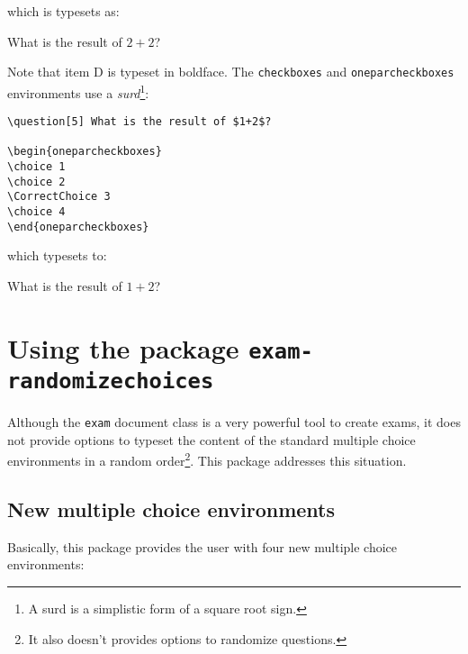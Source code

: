 \documentclass[12pt,a4paper]{exam}
\begin{document}
which is typesets as:

\printanswers

\begin{questions}
\setcounter{question}{4}
\question[5] What is the result of $2+2$?

\begin{choices}
\end{choices}
\end{questions}

Note that item D is typeset in boldface. The \texttt{checkboxes} and \texttt{oneparcheckboxes}
environments use a \emph{surd}\footnote{A surd is a simplistic form of a square root sign.}:

\begin{lstlisting}
\question[5] What is the result of $1+2$?

\begin{oneparcheckboxes}
\choice 1
\choice 2
\CorrectChoice 3
\choice 4
\end{oneparcheckboxes}
\end{lstlisting}

which typesets to:

\begin{questions}
\setcounter{question}{5}
\question[5] What is the result of $1+2$?

\begin{oneparcheckboxes}
\end{oneparcheckboxes}
\end{questions}

\noprintanswers


\section{Using the package \texttt{exam-randomizechoices}}
Although the \texttt{exam} document class is a very powerful tool to
create exams, it does not provide options to typeset the content of the
standard multiple choice environments in a random order\footnote{It
also doesn't provides options to randomize questions.}. This package
addresses this situation.

\subsection{New multiple choice environments}
Basically, this package provides the user with four new multiple choice
environments:
\end{document}
